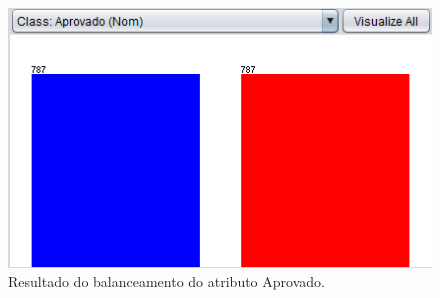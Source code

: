 \par
\begin{figure}[!htp]
	\begin{center}
    \caption{\label{fig:waveform_fig} Resultado do balanceamento do atributo Aprovado.}
	\includegraphics[scale=0.90]{Figuras/Atributo_aprovado_balanceado.png}
	\end{center}
\end{figure}

